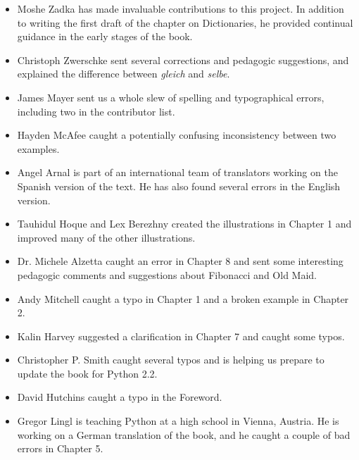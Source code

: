 \begin{itemize}

\item Moshe Zadka has made invaluable contributions to this project.
In addition to writing the first draft of the chapter on Dictionaries, he
provided continual guidance in the early stages of the book.


\item Christoph Zwerschke sent several corrections and
pedagogic suggestions, and explained the difference between {\em gleich}
and {\em selbe}.

\item James Mayer sent us a whole slew of spelling and
typographical errors, including two in the contributor list.


\item Hayden McAfee caught a potentially confusing inconsistency
between two examples.

\item Angel Arnal is part of an international team of translators
working on the Spanish version of the text.  He has also found several
errors in the English version.

\item Tauhidul Hoque and Lex Berezhny created the illustrations
in Chapter 1 and improved many of the other illustrations.

\item Dr. Michele Alzetta caught an error in Chapter 8 and sent
some interesting pedagogic comments and suggestions about Fibonacci
and Old Maid.

\item Andy Mitchell caught a typo in Chapter 1 and a broken example
in Chapter 2.

\item Kalin Harvey suggested a clarification in Chapter 7 and
caught some typos.

\item Christopher P. Smith caught several typos and is helping us
prepare to update the book for Python 2.2.

\item David Hutchins caught a typo in the Foreword.

\item Gregor Lingl is teaching Python at a high school in Vienna,
Austria.  He is working on a German translation of the book,
and he caught a couple of bad errors in Chapter 5.


\end{itemize}
